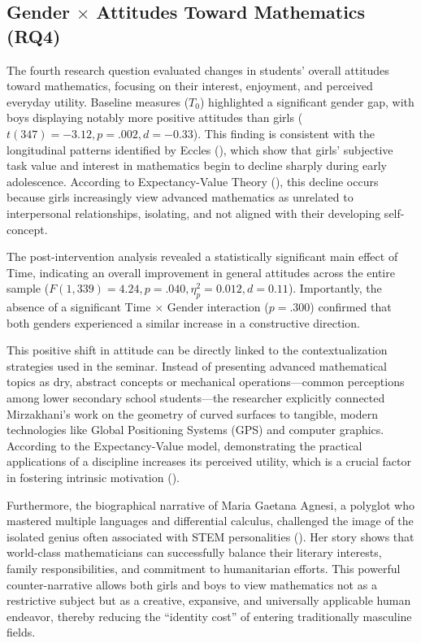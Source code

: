 \subsection{Gender $\times$ Attitudes Toward Mathematics (RQ4)}
The fourth research question evaluated changes in students' overall attitudes toward mathematics, focusing on their interest, enjoyment, and perceived everyday utility. Baseline measures ($T_0$) highlighted a significant gender gap, with boys displaying notably more positive attitudes than girls ($t(347) = -3.12, p = .002, d = -0.33$). This finding is consistent with the longitudinal patterns identified by Eccles (\citeyear{eccles1989}), which show that girls' subjective task value and interest in mathematics begin to decline sharply during early adolescence. According to Expectancy-Value Theory (\cite{EcclesWigfield2020, Eccles1983}), this decline occurs because girls increasingly view advanced mathematics as unrelated to interpersonal relationships, isolating, and not aligned with their developing self-concept.

The post-intervention analysis revealed a statistically significant main effect of Time, indicating an overall improvement in general attitudes across the entire sample ($F(1, 339) = 4.24, p = .040, \eta_p^2 = 0.012, d = 0.11$). Importantly, the absence of a significant Time $\times$ Gender interaction ($p = .300$) confirmed that both genders experienced a similar increase in a constructive direction.

This positive shift in attitude can be directly linked to the contextualization strategies used in the seminar. Instead of presenting advanced mathematical topics as dry, abstract concepts or mechanical operations—common perceptions among lower secondary school students—the researcher explicitly connected Mirzakhani's work on the geometry of curved surfaces to tangible, modern technologies like Global Positioning Systems (GPS) and computer graphics. According to the Expectancy-Value model, demonstrating the practical applications of a discipline increases its perceived utility, which is a crucial factor in fostering intrinsic motivation (\cite{Guiso2008}).

Furthermore, the biographical narrative of Maria Gaetana Agnesi, a polyglot who mastered multiple languages and differential calculus, challenged the image of the isolated genius often associated with STEM personalities (\cite{Diekman2010}).
Her story shows that world-class mathematicians can successfully balance their literary interests, family responsibilities, and commitment to humanitarian efforts. This powerful counter-narrative allows both girls and boys to view mathematics not as a restrictive subject but as a creative, expansive, and universally applicable human endeavor, thereby reducing the ``identity cost'' of entering traditionally masculine fields.

